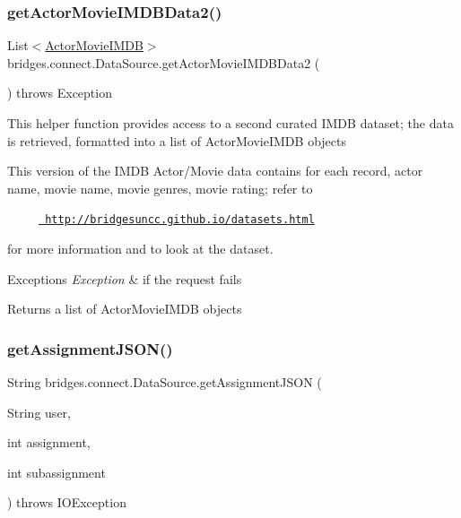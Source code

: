\subsubsection{\texorpdfstring{getActorMovieIMDBData2()}{getActorMovieIMDBData2()}}
{\footnotesize\ttfamily List$<$\mbox{\hyperlink{classbridges_1_1data__src__dependent_1_1_actor_movie_i_m_d_b}{Actor\+Movie\+I\+M\+DB}}$>$ bridges.\+connect.\+Data\+Source.\+get\+Actor\+Movie\+I\+M\+D\+B\+Data2 (\begin{DoxyParamCaption}{ }\end{DoxyParamCaption}) throws Exception}

This helper function provides access to a second curated I\+M\+DB dataset; the data is retrieved, formatted into a list of Actor\+Movie\+I\+M\+DB objects

This version of the I\+M\+DB Actor/\+Movie data contains for each record, actor name, movie name, movie genres, movie rating; refer to 

~~~~~\href{http://bridgesuncc.github.io/datasets.html}{\texttt{ http\+://bridgesuncc.\+github.\+io/datasets.\+html}} 

for more information and to look at the dataset.


\begin{DoxyExceptions}{Exceptions}
{\em Exception} & if the request fails\\
\hline
\end{DoxyExceptions}
\begin{DoxyReturn}{Returns}
a list of Actor\+Movie\+I\+M\+DB objects 
\end{DoxyReturn}
\mbox{\label{classbridges_1_1connect_1_1_data_source_af2f6cd7172acb64b2ba49f134b5391f8}} 
\subsubsection{\texorpdfstring{getAssignmentJSON()}{getAssignmentJSON()}\hspace{0.1cm}{\footnotesize\ttfamily [1/2]}}
{\footnotesize\ttfamily String bridges.\+connect.\+Data\+Source.\+get\+Assignment\+J\+S\+ON (\begin{DoxyParamCaption}\item[{String}]{user,  }\item[{int}]{assignment,  }\item[{int}]{subassignment }\end{DoxyParamCaption}) throws I\+O\+Exception}

